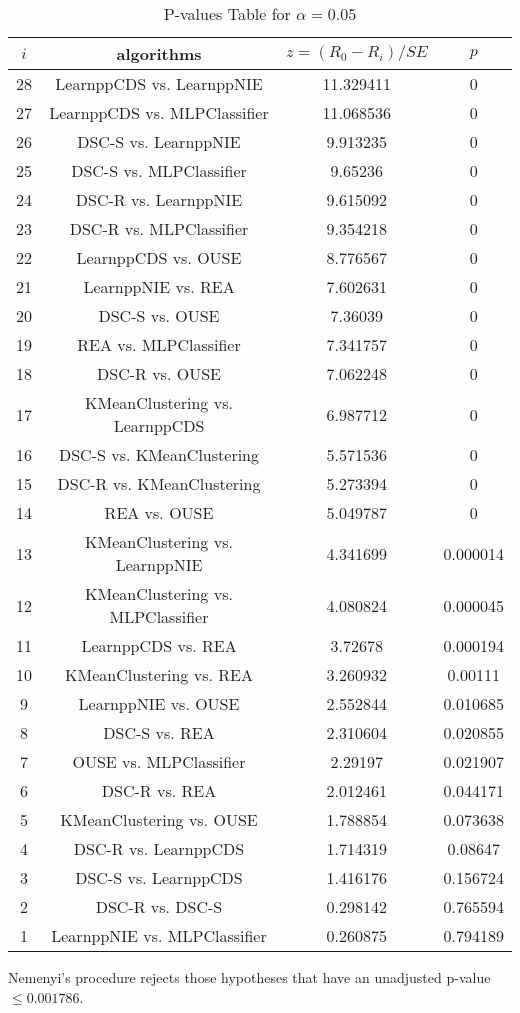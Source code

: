 \documentclass[a4paper,10pt]{article}
\begin{document}
\begin{landscape}
\begin{table}[!htp]
\centering\scriptsize
\begin{tabular}{cccc}
$i$&algorithms&$z=(R_0 - R_i)/SE$&$p$\\
\hline28&LearnppCDS vs. LearnppNIE&11.329411&0\\
27&LearnppCDS vs. MLPClassifier&11.068536&0\\
26&DSC-S vs. LearnppNIE&9.913235&0\\
25&DSC-S vs. MLPClassifier&9.65236&0\\
24&DSC-R vs. LearnppNIE&9.615092&0\\
23&DSC-R vs. MLPClassifier&9.354218&0\\
22&LearnppCDS vs. OUSE&8.776567&0\\
21&LearnppNIE vs. REA&7.602631&0\\
20&DSC-S vs. OUSE&7.36039&0\\
19&REA vs. MLPClassifier&7.341757&0\\
18&DSC-R vs. OUSE&7.062248&0\\
17&KMeanClustering vs. LearnppCDS&6.987712&0\\
16&DSC-S vs. KMeanClustering&5.571536&0\\
15&DSC-R vs. KMeanClustering&5.273394&0\\
14&REA vs. OUSE&5.049787&0\\
13&KMeanClustering vs. LearnppNIE&4.341699&0.000014\\
12&KMeanClustering vs. MLPClassifier&4.080824&0.000045\\
11&LearnppCDS vs. REA&3.72678&0.000194\\
10&KMeanClustering vs. REA&3.260932&0.00111\\
9&LearnppNIE vs. OUSE&2.552844&0.010685\\
8&DSC-S vs. REA&2.310604&0.020855\\
7&OUSE vs. MLPClassifier&2.29197&0.021907\\
6&DSC-R vs. REA&2.012461&0.044171\\
5&KMeanClustering vs. OUSE&1.788854&0.073638\\
4&DSC-R vs. LearnppCDS&1.714319&0.08647\\
3&DSC-S vs. LearnppCDS&1.416176&0.156724\\
2&DSC-R vs. DSC-S&0.298142&0.765594\\
1&LearnppNIE vs. MLPClassifier&0.260875&0.794189\\
\hline
\end{tabular}
\caption{P-values Table for $\alpha=0.05$}
\end{table}Nemenyi's procedure rejects those hypotheses that have an unadjusted p-value $\le0.001786$.


\end{landscape}
\end{document}
